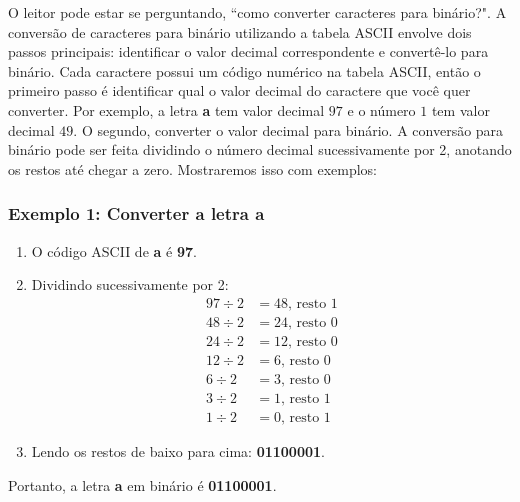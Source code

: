 O leitor pode estar se perguntando, “como converter caracteres para binário?". 
A conversão de caracteres para binário utilizando a tabela ASCII envolve dois passos principais: identificar o valor decimal correspondente e convertê-lo para binário. Cada caractere possui um código numérico na tabela ASCII, então o primeiro passo é identificar qual o valor decimal do caractere que você quer converter. Por exemplo, a letra \textbf{a} tem valor decimal $97$ e o número $1$ tem valor decimal $49$. O segundo, converter o valor decimal para binário. A conversão para binário pode ser feita dividindo o número decimal sucessivamente por 2, anotando os restos até chegar a zero. Mostraremos isso com exemplos:

\subsubsection*{Exemplo 1: Converter a letra \textbf{a}}
\begin{enumerate}
    \item O código ASCII de \textbf{a} é \textbf{97}.
    \item Dividindo sucessivamente por 2:
    \begin{align*}
        97 \div 2 &= 48 \text{, resto } 1 \\
        48 \div 2 &= 24 \text{, resto } 0 \\
        24 \div 2 &= 12 \text{, resto } 0 \\
        12 \div 2 &= 6 \text{, resto } 0 \\
        6 \div 2 &= 3 \text{, resto } 0 \\
        3 \div 2 &= 1 \text{, resto } 1 \\
        1 \div 2 &= 0 \text{, resto } 1
    \end{align*}
    \item Lendo os restos de baixo para cima: \textbf{01100001}.
\end{enumerate}
Portanto, a letra \textbf{a} em binário é \textbf{01100001}.

